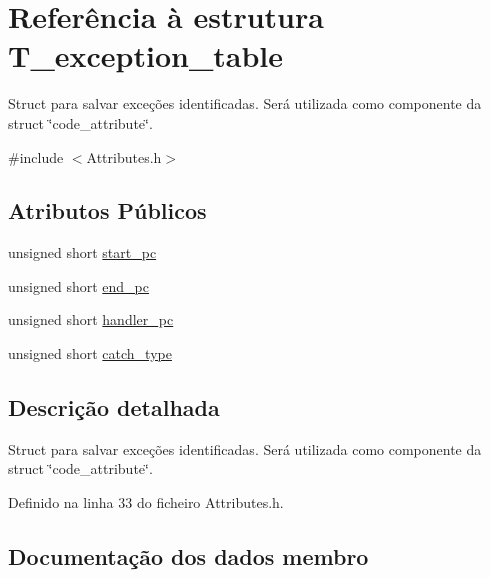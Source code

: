 \hypertarget{structT__exception__table}{}\section{Referência à estrutura T\+\_\+exception\+\_\+table}
\label{structT__exception__table}


Struct para salvar exceções identificadas. Será utilizada como componente da struct \char`\"{}code\+\_\+attribute\char`\"{}.  




{\ttfamily \#include $<$Attributes.\+h$>$}

\subsection*{Atributos Públicos}
\begin{DoxyCompactItemize}
\item 
unsigned short \hyperlink{structT__exception__table_a89ad17b9f257aa9589ed07bfaa263005}{start\+\_\+pc}
\item 
unsigned short \hyperlink{structT__exception__table_a464d6f303abe547b03a8ac819db09c42}{end\+\_\+pc}
\item 
unsigned short \hyperlink{structT__exception__table_a2ffa8b7191177ca3689728d9eb329323}{handler\+\_\+pc}
\item 
unsigned short \hyperlink{structT__exception__table_a4c851e59c8a3c72a6010e461ad82dd16}{catch\+\_\+type}
\end{DoxyCompactItemize}


\subsection{Descrição detalhada}
Struct para salvar exceções identificadas. Será utilizada como componente da struct \char`\"{}code\+\_\+attribute\char`\"{}. 

Definido na linha 33 do ficheiro Attributes.\+h.



\subsection{Documentação dos dados membro}
\mbox{\label{structT__exception__table_a4c851e59c8a3c72a6010e461ad82dd16}} 
